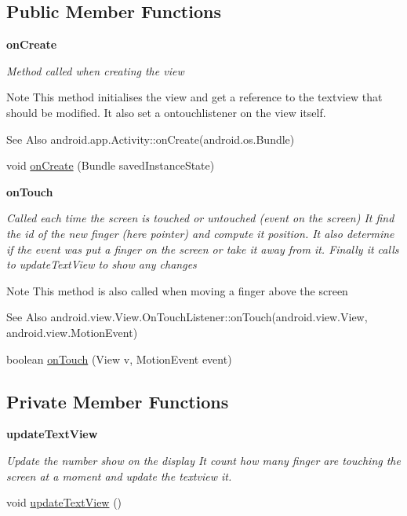 \subsection*{Public Member Functions}
\begin{Indent}{\bf on\-Create}\par
{\em Method called when creating the view

\begin{DoxyNote}{Note}
This method initialises the view and get a reference to the textview that should be modified. It also set a ontouchlistener on the view itself.
\end{DoxyNote}
\begin{DoxySeeAlso}{See Also}
android.\-app.\-Activity\-::on\-Create(android.\-os.\-Bundle) 
\end{DoxySeeAlso}
}\begin{DoxyCompactItemize}
\item 
void \hyperlink{classnpi_1_1practicaandroid_1_1tutorialnpi_1_1_multitouch_a27ce5119eae058afd6b3fbe5c3fb3d8e}{on\-Create} (Bundle saved\-Instance\-State)
\end{DoxyCompactItemize}
\end{Indent}
\begin{Indent}{\bf on\-Touch}\par
{\em Called each time the screen is touched or untouched (event on the screen) It find the id of the new finger (here pointer) and compute it position. It also determine if the event was put a finger on the screen or take it away from it. Finally it calls to update\-Text\-View to show any changes

\begin{DoxyNote}{Note}
This method is also called when moving a finger above the screen 
\end{DoxyNote}
\begin{DoxySeeAlso}{See Also}
android.\-view.\-View.\-On\-Touch\-Listener\-::on\-Touch(android.\-view.\-View, android.\-view.\-Motion\-Event) 
\end{DoxySeeAlso}
}\begin{DoxyCompactItemize}
\item 
boolean \hyperlink{classnpi_1_1practicaandroid_1_1tutorialnpi_1_1_multitouch_a39fb9d45d71e28ce7766262c99f37cdf}{on\-Touch} (View v, Motion\-Event event)
\end{DoxyCompactItemize}
\end{Indent}
\subsection*{Private Member Functions}
\begin{Indent}{\bf update\-Text\-View}\par
{\em Update the number show on the display It count how many finger are touching the screen at a moment and update the textview it. }\begin{DoxyCompactItemize}
\item 
void \hyperlink{classnpi_1_1practicaandroid_1_1tutorialnpi_1_1_multitouch_a7ebbe3ea40a1d689487c47689982d280}{update\-Text\-View} ()
\end{DoxyCompactItemize}
\end{Indent}


